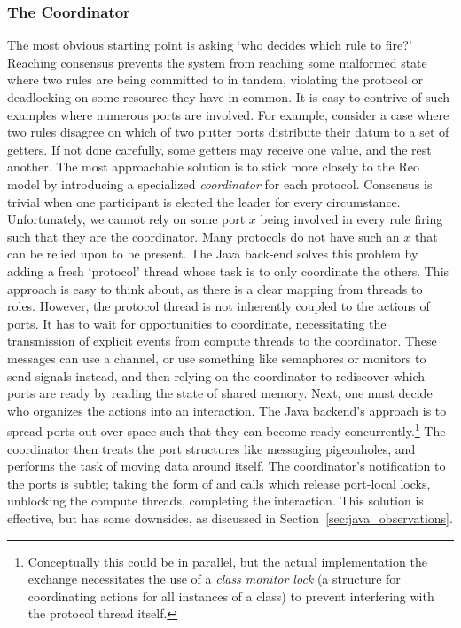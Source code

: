 \subsubsection{The Coordinator}
The most obvious starting point is asking `who decides which rule to fire?' Reaching consensus prevents the system from reaching some malformed state where two rules are being committed to in tandem, violating the protocol or deadlocking on some resource they have in common. It is easy to contrive of such examples where numerous ports are involved. For example, consider a case where two rules disagree on which of two putter ports distribute their datum to a set of getters. If not done carefully, some getters may receive one value, and the rest another. The most approachable solution is to stick more closely to the Reo model by introducing a specialized \textit{coordinator} for each protocol. Consensus is trivial when one participant is elected the leader for every circumstance. Unfortunately, we cannot rely on some port $x$ being involved in every rule firing such that they are the coordinator. Many protocols do not have such an $x$ that can be relied upon to be present. The Java back-end solves this problem by adding a fresh `protocol' thread whose task is to only coordinate the others. This approach is easy to think about, as there is a clear mapping from threads to roles. However, the protocol thread is not inherently coupled to the actions of ports. It has to wait for opportunities to coordinate, necessitating the transmission of explicit events from compute threads to the coordinator. These messages can use a channel, or use something like semaphores or monitors to send signals instead, and then relying on the coordinator to rediscover which ports are ready by reading the state of shared memory. Next, one must decide who organizes the actions into an interaction. The Java backend's approach is to spread ports out over space such that they can become ready concurrently.\footnote{Conceptually this could be in parallel, but the actual implementation the exchange necessitates the use of a \textit{class monitor lock} (a structure for coordinating actions for all instances of a class) to prevent interfering with the protocol thread itself.} The coordinator then treats the port structures like messaging pigeonholes, and performs the task of moving data around itself. The coordinator's notification to the ports is subtle; taking the form of  and  calls which release port-local locks, unblocking the compute threads, completing the interaction. This solution is effective, but has some downsides, as discussed in Section~\ref{sec:java_observations}. 

